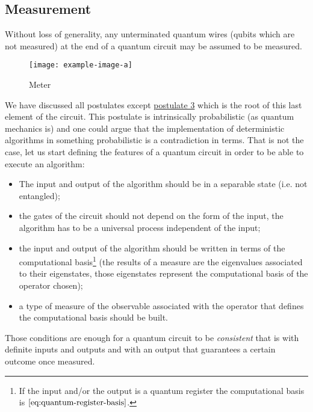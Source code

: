\subsection{Measurement}
\begin{theorem}
Without loss of generality, any unterminated quantum wires (qubits which are not measured) at the end of a quantum circuit may be assumed to be measured. \cite[p.187]{Shankar}
\end{theorem}
\begin{figure}[htb]
\centering
\texttt{[image: example-image-a]}
\caption{Meter}
\label{fig:measurement}
\end{figure}
We have discussed all postulates except \hyperref[postulate:3]{postulate 3} which is the root of this last element of the circuit.
This postulate is intrinsically probabilistic (as quantum mechanics is) and one could argue that the implementation of deterministic algorithms in something probabilistic is a contradiction in terms.
That is not the case, let us start defining the features of a quantum circuit in order to be able to execute an algorithm:
\begin{itemize}
    \item The input and output of the algorithm should be in a separable state (i.e. not entangled);
    \item the gates of the circuit should not depend on the form of the input, the algorithm has to be a universal process independent of the input;
    \item the input and output of the algorithm should be written in terms of the computational basis\footnote{If the input and/or the output is a quantum register the computational basis is $\eqref{eq:quantum-register-basis}$.} (the results of a measure are the eigenvalues associated to their eigenstates, those eigenstates represent the computational basis of the operator chosen);
    \item a type of measure of the observable associated with the operator that defines the computational basis should be built.
\end{itemize}

Those conditions are enough for a quantum circuit to be \emph{consistent} that is with definite inputs and outputs and with an output that guarantees a certain outcome once measured.
